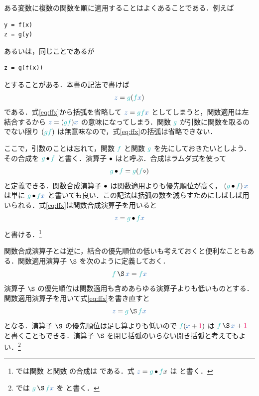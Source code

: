 \documentclass[a5paper,twoside,fleqn,draft]{jsbook}
\begin{document}
ある変数に複数の関数を順に適用することはよくあることである．例えば
\begin{pythoncode}
\begin{verbatim}
y = f(x)
z = g(y)
\end{verbatim}
\end{pythoncode}
あるいは，同じことであるが
\begin{pythoncode}
\begin{verbatim}
z = g(f(x))
\end{verbatim}
\end{pythoncode}
とすることがある．本書の記法で書けば
\begin{equation}
  \label{eq:ffx}
  \hVar{z}=
  \hFunc{g}(\hFunc{f}\hVar{x})
\end{equation}
である．式\eqref{eq:ffx}から括弧を省略して $\hVar{z}=\hFunc{g}\hFunc{f}\hVar{x}$ としてしまうと，関数適用は左結合するから $\hVar{z}=(\hFunc{g}\hFunc{f})\hVar{x}$ の意味になってしまう．関数 $\hFunc{g}$ が引数に関数を取るのでない限り $(\hFunc{g}\hFunc{f})$ は無意味なので，式\eqref{eq:ffx}の括弧は省略できない．

ここで，引数のことは忘れて，関数 $\hFunc{f}$ と関数 $\hFunc{g}$ を先にしておきたいとしよう．その合成を $\hFunc{g}\hCompose\hFunc{f}$ と書く．演算子 $\operatorname{\bullet}$ はと呼ぶ．合成はラムダ式を使って
\begin{equation}
  \hFunc{g}\hCompose \hFunc{f}
  =\hFunc{g}(\hFunc{f}\hAnonParam)
\end{equation}
と定義できる．関数合成演算子 $\operatorname{\bullet}$ は関数適用よりも優先順位が高く， $\left(\hFunc{g}\hCompose \hFunc{f}\right)\hVar{x}$ は単に $\hFunc{g}\hCompose\hFunc{f}\hVar{x}$ と書いても良い．この記法は括弧の数を減らすためにしばしば用いられる．式\eqref{eq:ffx}は関数合成演算子を用いると
\begin{equation}
  \hVar{z}
  =\hFunc{g}\hCompose\hFunc{f}\hVar{x}
\end{equation}
と書ける．\footnote{\haskell では関数  と関数  の合成は  である．式 $\hVar{z}=\hFunc{g}\hCompose \hFunc{f} x$ は  と書く．}

関数合成演算子とは逆に，結合の優先順位の低いも考えておくと便利なこともある．関数適用演算子 $\hApply$ を次のように定義しておく．
\begin{equation}
  \hFunc{f}\hApply\hVar{x}
  =\hFunc{f}\hVar{x}
\end{equation}
演算子 $\hApply$ の優先順位は関数適用も含めあらゆる演算子よりも低いものとする．関数適用演算子を用いて式\eqref{eq:ffx}を書き直すと
\begin{equation}
  \hVar{z}
  =\hFunc{g}\hApply\hFunc{f}\hVar{x}
\end{equation}
となる．演算子 $\hApply$ の優先順位は足し算よりも低いので $\hFunc{f}(\hVar{x}+\hConstant{1})$ は $\hFunc{f}\hApply\hVar{x}+\hConstant{1}$ と書くこともできる．演算子 $\hApply$ を閉じ括弧のいらない開き括弧と考えてもよい．\footnote{\haskell では $\hFunc{g}\hApply\hFunc{f}\hVar{x}$ を  と書く．}
\end{document}
